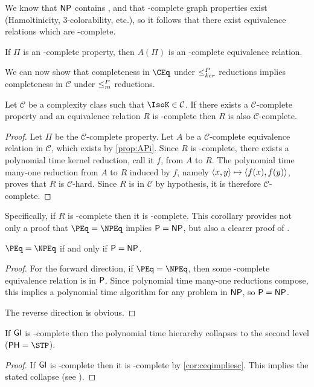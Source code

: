 We know that $\NP$ contains \GI, and that \NP-complete graph properties exist (Hamoltinicity, 3-colorability, etc.), so it follows that there exist equivalence relations which are \NP-complete.

\begin{corollary}
  If $\Pi$ is an \NP-complete property, then $A(\Pi)$ is an \NP-complete equivalence relation.
\end{corollary}

We can now show that completeness in $\CEq$ under $\kr$ reductions implies completeness in $\mathcal{C}$ under $\mor$ reductions.

\begin{corollary}\label{cor:ceqimpliesc}
  Let $\mathcal{C}$ be a complexity class such that $\IsoK\in\mathcal{C}$.
  If there exists a $\mathcal{C}$-complete property and an equivalence relation $R$ is \CEq-complete then $R$ is also $\mathcal{C}$-complete.
\end{corollary}
\begin{proof}
  Let $\Pi$ be the $\mathcal{C}$-complete property.
  Let $A$ be a $\mathcal{C}$-complete equivalence relation in $\mathcal{C}$, which exists by \autoref{prop:APi}.
  Since $R$ is \CEq-complete, there exists a polynomial time kernel reduction, call it $f$, from $A$ to $R$.
  The polynomial time many-one reduction from $A$ to $R$ induced by $f$, namely $\pair{x}{y}\mapsto\pair{f(x)}{f(y)}$, proves that $R$ is $\mathcal{C}$-hard.
  Since $R$ is in $\mathcal{C}$ by hypothesis, it is therefore $\mathcal{C}$-complete.
\end{proof}

Specifically, if $R$ is \NPEq-complete then it is \NP-complete.
This corollary provides not only a proof that $\PEq=\NPEq$ implies $\P=\NP$, but also a clearer proof of \autocite[Proposition~8.1]{bcffm}.

\begin{corollary}
  $\PEq=\NPEq$ if and only if $\P=\NP$.
\end{corollary}
\begin{proof}
  For the forward direction, if $\PEq=\NPEq$, then some \NP-complete equivalence relation is in $\P$.
  Since polynomial time many-one reductions compose, this implies a polynomial time algorithm for any problem in $\NP$, so $\P=\NP$.

  The reverse direction is obvious.
\end{proof}

\begin{proposition}
  If $\GI$ is \NPEq-complete then the polynomial time hierarchy collapses to the second level ($\PH=\STP$).
\end{proposition}
\begin{proof}
  If $\GI$ is \NPEq-complete then it is \NP-complete by \autoref{cor:ceqimpliesc}.
  This implies the stated collapse (see \autocite{schoning87}).
\end{proof}

